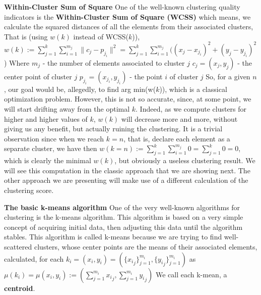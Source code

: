 \documentclass[12pt]{article}
\begin{document}
\textbf{Within-Cluster Sum of Square} \newline
One of the well-known clustering quality indicators is the \textbf{Within-Cluster Sum of Square (WCSS)} \newline
which means, we calculate the squared distances of all the elements from their associated clusters, \newline
That is (using $w(k)$ instead of WCSS($k$)), \newline
\( w(k):= \sum_{j=1}^{k} \sum_{i=1}^{m_j} \lVert c_j - p_{j_i} \rVert^2=\sum_{j=1}^{k} \sum_{i=1}^{m_j} ((x_j - x_{j_i})^2+(y_j - y_{j_i})^2 \)) \newline
Where \newline
$m_j$ - the number of elements associated to cluster \( j \) \newline
$c_j=(x_j,y_j)$ - the center point of cluster \( j \) \newline
$p_{j_i}=(x_{j_i},y_{j_i})$ - the point $i$ of cluster \( j \) \newline
So, for a given $n$, our goal would be, allegedly, to find arg min(w($k$)), which is a classical optimization problem. \newline
However, this is not so accurate, since, at some point, we will start drifting away from the optimal $k$. \newline
Indeed, as we compute clusters for higher and higher values of $k$, $w(k)$ will decrease more and more, without giving us any benefit, but actually ruining the clustering. \newline
It is a trivial observation since when we reach \( k=n \), that is, declare each element as a separate cluster, we have then  \( w(k=n):= \sum_{j=1}^{k} \sum_{i=1}^{m_j} 0=\sum_{j=1}^{k} 0=0 \),
which is clearly the minimal $w(k)$, but obviously a useless clustering result. \newline
We will see this computation in the classic approach that we are showing next. The other approach we are presenting will make use of a different calculation of the clustering score. 

\newpage
\textbf{The basic k-means algorithm} \newline
One of the very well-known algorithms for clustering is the k-means algorithm. \newline
This algorithm is based on a very simple concept of acquiring initial data, 
then adjusting this data until the algorithm stables. This algorithm is called k-means 
because we are trying to find well-scattered clusters, whose center points are the means of their associated elements, calculated, for each $k_i=(x_i,y_i)=(\{{{x_i}_j}\}_{j=1}^{m_i},\{{{y_i}_j}\}_{j=1}^{m_i})$ as 
$\mu(k_i)=\mu(x_i,y_i):=(\sum_{j=1}^{m_i}{{x_i}_j},\sum_{j=1}^{m_i}{{y_i}_j})$ \newline
We call each k-mean, a \textbf{centroid}. \newline
\end{document}
